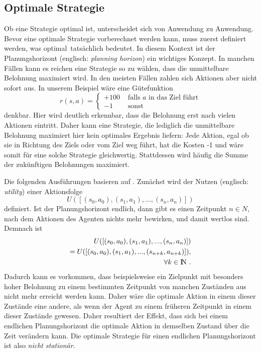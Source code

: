 \documentclass[a4paper]{IEEEtran}
\def\IN{\mathrm{I\hspace{-2pt}N}} %
\begin{document}
\subsection{Optimale Strategie}
Ob eine Strategie optimal ist, unterscheidet sich von Anwendung zu Anwendung. Bevor eine optimale Strategie vorberechnet werden kann, muss zuerst definiert werden, was \glqq optimal\grqq\ tatsächlich bedeutet. In diesem Kontext ist der Planungshorizont (englisch: \emph{planning horizon}) ein wichtiges Konzept. In manchen Fällen kann es reichen eine Strategie so zu wählen, dass die unmittelbare Belohnung maximiert wird. In den meisten Fällen zahlen sich Aktionen aber nicht sofort aus. In unserem Beispiel wäre eine Gütefunktion
\begin{equation}
	r(s,a) = \left\{ \begin{array}{rl}
		+100 &\mbox{ falls $a$ in das Ziel führt} \\
		-1 &\mbox{ sonst}
       \end{array} \right.
\end{equation}
denkbar. Hier wird deutlich erkennbar, dass die Belohnung erst nach vielen Aktionen eintritt. Daher kann eine Strategie, die lediglich die unmittelbare Belohnung maximiert hier kein optimales Ergebnis liefern: Jede Aktion, egal ob sie in Richtung des Ziels oder vom Ziel weg führt, hat die Kosten -1 und wäre somit für eine solche Strategie gleichwertig.
Stattdessen wird häufig die Summe der zukünftigen Belohnungen maximiert.

Die folgenden Ausführungen basieren auf \cite{russell1995artificial}. Zunächst wird der Nutzen (englisch: \emph{utility}) einer Aktionsfolge 
\begin{equation}
	U([(s_0, a_0), (s_1, a_1), ..., (s_n, a_n)])
\end{equation}
definiert. Ist der Planungshorizont endlich, dann gibt es einen Zeitpunkt $n \in N$, nach dem Aktionen des Agenten nichts mehr bewirken, und damit wertlos sind. Demnach ist 
\begin{equation}
	\begin{split}
		U([ (s_0, a_0), (s_1, a_1), ..., (s_n, a_n)]) \\
		= U([ (s_0, a_0), (s_1, a_1), ..., (s_{n+k}, a_{n+k})]),\\
		\forall k \in \IN \ .
	\end{split}
\end{equation}
Dadurch kann es vorkommen, dass beispielsweise ein Zielpunkt mit besonders hoher Belohnung zu einem bestimmten Zeitpunkt von manchen Zuständen aus nicht mehr erreicht werden kann. Daher wäre die optimale Aktion in einem dieser Zustände eine andere, als wenn der Agent zu einem früheren Zeitpunkt in einem dieser Zustände gewesen. Daher resultiert der Effekt, dass sich bei einem endlichen Planungshorizont die optimale Aktion in demselben Zustand über die Zeit verändern kann. Die optimale Strategie für einen endlichen Planungshorizont ist also \emph{nicht stationär}.
\end{document}
